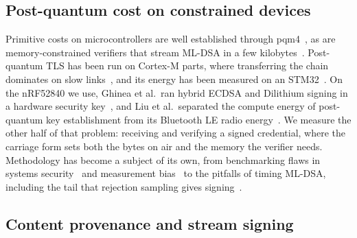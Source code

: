 \subsection{Post-quantum cost on constrained devices}
\label{sec:related-bench}

Primitive costs on microcontrollers are well established through
pqm4~\cite{kannwischer2019pqm4,pqm4,abdulrahman2022faster}, as are
memory-constrained verifiers that stream ML-DSA in a few
kilobytes~\cite{gonzalez2021verifying,bos2022dilithium}. Post-quantum TLS
has been run on Cortex-M parts, where transferring the chain dominates on slow
links~\cite{burstinghaus2020embedded,gonzalez2022kemtls}, and its energy has
been measured on an STM32~\cite{tasopoulos2023energy}. On the nRF52840 we use,
Ghinea et al.\ ran hybrid ECDSA and Dilithium signing in a hardware security
key~\cite{ghinea2023hybrid}, and Liu et al.\ separated the compute energy of
post-quantum key establishment from its Bluetooth LE radio
energy~\cite{liu2026energy}. We measure the other half of that problem:
receiving and verifying a signed credential, where the carriage form sets both
the bytes on air and the memory the verifier needs. Methodology has become a
subject of its own, from benchmarking flaws in systems
security~\cite{vanderkouwe2019sok} and measurement bias~\cite{mytkowicz2009}
to the pitfalls of timing ML-DSA, including the tail that rejection sampling
gives signing~\cite{riou2026}.

\subsection{Content provenance and stream signing}
\label{sec:related-prov}

